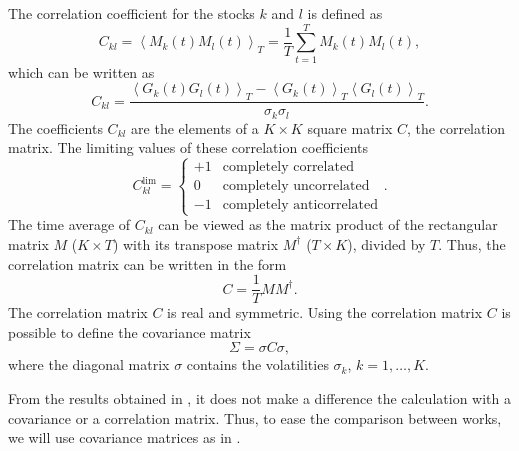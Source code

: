 The correlation coefficient for the stocks $k$ and $l$ is defined as
\cite{non_stationarity_fin_guhr}
\begin{equation}
    C_{kl} = \left\langle M_{k} \left( t \right) M_{l} \left( t \right)
    \right\rangle_{T} = \frac{1}{T} \sum_{t=1}^{T} M_{k} \left( t \right) M_{l}
    \left( t \right),
\end{equation}
which can be written as
\begin{equation}
    C_{kl} = \frac{\left\langle G_{k} \left( t \right) G_{l} \left( t \right)
    \right\rangle_{T} - \left\langle G_{k} \left( t \right) \right\rangle_{T}
    \left\langle G_{l} \left( t \right) \right\rangle_{T}}
    {\sigma_{k} \sigma_{l}}.
\end{equation}
The coefficients $C_{kl}$ are the elements of a $K \times K$ square matrix $C$,
the correlation matrix. The limiting values of these correlation coefficients
\begin{equation}
    C_{kl}^{\text{lim}} =
    \left\{
    \begin{array}{cc}
    +1 & \text{completely correlated}  \\
    0  & \text{completely uncorrelated}\\
    -1 & \text{completely anticorrelated}
    \end{array}
    \right. .
\end{equation}
The time average of $C_{kl}$ can be viewed as the matrix product of the
rectangular matrix $M$ ($K \times T$) with its transpose matrix $M^{\dagger}$
($T \times K$), divided by $T$. Thus, the correlation matrix can be written in
the form
\begin{equation}
    C = \frac{1}{T} M M^{\dagger}.
\end{equation}
The correlation matrix $C$ is real and symmetric. Using the correlation matrix
$C$ is possible to define the covariance matrix
\cite{credit_risk_guhr,portfolio_distributions_guhr,asset_correlations_guhr,stochastic_cov_guhr,exact_distributions_guhr}
\begin{equation}
    \Sigma = \sigma C \sigma ,
\end{equation}
where the diagonal matrix $\sigma$ contains the volatilities $\sigma_{k}$,
$k = 1, \ldots, K$.

From the results obtained in
\cite{portfolio_distributions_guhr,non_stationarity_fin_guhr}, it does not make
a difference the calculation with a covariance or a correlation matrix. Thus,
to ease the comparison between works, we will use covariance matrices as in
\cite{non_stationarity_fin_guhr}.

